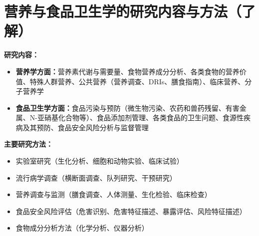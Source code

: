 \section{营养与食品卫生学的研究内容与方法（了解）}

\begin{tipbox}
\textbf{研究内容：}
\begin{itemize}[leftmargin=*]
    \item \textbf{营养学方面：}营养素代谢与需要量、食物营养成分分析、各类食物的营养价值、特殊人群营养、公共营养（营养调查、DRIs、膳食指南）、临床营养、分子营养学
    \item \textbf{食品卫生学方面：}食品污染与预防（微生物污染、农药和兽药残留、有害金属、N-亚硝基化合物等）、食品添加剂管理、各类食品的卫生问题、食源性疾病及其预防、食品安全风险分析与监督管理
\end{itemize}

\textbf{主要研究方法：}
\begin{itemize}[leftmargin=*]
    \item 实验室研究（生化分析、细胞和动物实验、临床试验）
    \item 流行病学调查（横断面调查、队列研究、干预研究）
    \item 营养调查与监测（膳食调查、人体测量、生化检验、临床检查）
    \item 食品安全风险评估（危害识别、危害特征描述、暴露评估、风险特征描述）
    \item 食物成分分析方法（化学分析、仪器分析）
\end{itemize}
\end{tipbox}

